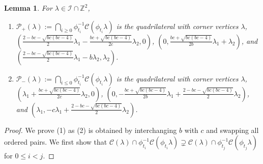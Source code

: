 \documentclass{amsart}
\newtheorem{lemma}[theorem]{Lemma}
\numberwithin{theorem}{section}
\newcommand{\cC}{\mathcal{C}}
\newcommand{\cI}{\mathcal{I}}
\newcommand{\cP}{\mathcal{P}}
\newcommand{\ZZ}{\mathbb{Z}}
\begin{document}
  \begin{lemma}
    \label{le:one direction}
    For $\lambda\in\cI\cap\ZZ^2$, 
    \begin{enumerate}
      \item $\cP_+(\lambda):=\bigcap_{i \ge 0}\phi_{t_i}^{-1}\cC(\phi_{t_i}\lambda)$ is the quadrilateral with corner vertices $\lambda$, $(\frac{2-bc-\sqrt{bc(bc-4)}}{2}\lambda_1-\frac{bc+\sqrt{bc(bc-4)}}{2c}\lambda_2,0)$, $(0,\frac{bc+\sqrt{bc(bc-4)}}{2b}\lambda_1+\lambda_2)$, and $(\frac{2-bc-\sqrt{bc(bc-4)}}{2}\lambda_1-b\lambda_2,\lambda_2)$.
      \item $\cP_-(\lambda):=\bigcap_{i \le 0}\phi_{t_i}^{-1}\cC(\phi_{t_i}\lambda)$ is the quadrilateral with corner vertices $\lambda$, $(\lambda_1+\frac{bc+\sqrt{bc(bc-4)}}{2c}\lambda_2,0)$, $(0,-\frac{bc+\sqrt{bc(bc-4)}}{2b}\lambda_1+\frac{2-bc-\sqrt{bc(bc-4)}}{2}\lambda_2)$, and $(\lambda_1,-c\lambda_1+\frac{2-bc-\sqrt{bc(bc-4)}}{2}\lambda_2)$.
    \end{enumerate}
  \end{lemma}
  \begin{proof}
    We prove (1) as (2) is obtained by interchanging $b$ with $c$ and swapping all ordered pairs.  
    We first show that $\cC(\lambda) \cap \phi_{t_i}^{-1}\cC(\phi_{t_i}\lambda)\supsetneq \cC(\lambda) \cap \phi_{t_j}^{-1}\cC(\phi_{t_j}\lambda)$ for $0\le i<j$.
  \end{proof}
\end{document}
